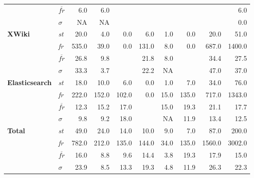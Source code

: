 \begin{tabular}{ l l | r r r r r r r | r }
  & $\overline{fr}$  & 6.0 & 6.0 &   &   &   &   &   & 6.0\\ 
 & $\sigma$  & NA & NA &   &   &   &   &   & 0.0\\ 
\hline 
\textbf{ XWiki } & \textit{st}  & 20.0 & 4.0 & 0.0  & 6.0 & 1.0 & 0.0  & 20.0 & 51.0\\ 
  & \textit{fr}  & 535.0 & 39.0 & 0.0 & 131.0 & 8.0 & 0.0 & 687.0 & 1400.0\\ 
  & $\overline{fr}$  & 26.8 & 9.8 &   & 21.8 & 8.0 &   & 34.4 & 27.5\\ 
 & $\sigma$  & 33.3 & 3.7 &   & 22.2 & NA &   & 47.0 & 37.0\\ 
\hline 
\textbf{ Elasticsearch } & \textit{st}  & 18.0 & 10.0 & 6.0 & 0.0  & 1.0 & 7.0 & 34.0 & 76.0\\ 
  & \textit{fr}  & 222.0 & 152.0 & 102.0 & 0.0 & 15.0 & 135.0 & 717.0 & 1343.0\\ 
  & $\overline{fr}$  & 12.3 & 15.2 & 17.0 &   & 15.0 & 19.3 & 21.1 & 17.7\\ 
 & $\sigma$  & 9.8 & 9.2 & 18.0 &   & NA & 11.9 & 13.4 & 12.5\\ 
\hline 
 \textbf{Total}  & \textit{st}  & 49.0 & 24.0 & 14.0 & 10.0 & 9.0 & 7.0 & 87.0 & 200.0\\ 
  & \textit{fr}  & 782.0 & 212.0 & 135.0 & 144.0 & 34.0 & 135.0 & 1560.0 & 3002.0\\ 
  & $\overline{fr}$  & 16.0 & 8.8 & 9.6 & 14.4 & 3.8 & 19.3 & 17.9 & 15.0\\ 
 & $\sigma$  & 23.9 & 8.5 & 13.3 & 19.3 & 4.8 & 11.9 & 26.3 & 22.3\\ 
\end{tabular}